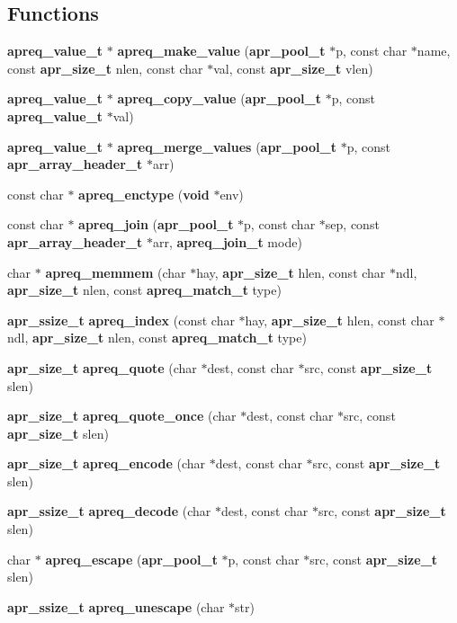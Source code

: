 \subsection*{Functions}
\begin{CompactItemize}
\item 
{\bf apreq\_\-value\_\-t} $\ast$ {\bf apreq\_\-make\_\-value} ({\bf apr\_\-pool\_\-t} $\ast$p, const char $\ast$name, const {\bf apr\_\-size\_\-t} nlen, const char $\ast$val, const {\bf apr\_\-size\_\-t} vlen)
\item 
{\bf apreq\_\-value\_\-t} $\ast$ {\bf apreq\_\-copy\_\-value} ({\bf apr\_\-pool\_\-t} $\ast$p, const {\bf apreq\_\-value\_\-t} $\ast$val)
\item 
{\bf apreq\_\-value\_\-t} $\ast$ {\bf apreq\_\-merge\_\-values} ({\bf apr\_\-pool\_\-t} $\ast$p, const {\bf apr\_\-array\_\-header\_\-t} $\ast$arr)
\item 
const char $\ast$ {\bf apreq\_\-enctype} ({\bf void} $\ast$env)
\item 
const char $\ast$ {\bf apreq\_\-join} ({\bf apr\_\-pool\_\-t} $\ast$p, const char $\ast$sep, const {\bf apr\_\-array\_\-header\_\-t} $\ast$arr, {\bf apreq\_\-join\_\-t} mode)
\item 
char $\ast$ {\bf apreq\_\-memmem} (char $\ast$hay, {\bf apr\_\-size\_\-t} hlen, const char $\ast$ndl, {\bf apr\_\-size\_\-t} nlen, const {\bf apreq\_\-match\_\-t} type)
\item 
{\bf apr\_\-ssize\_\-t} {\bf apreq\_\-index} (const char $\ast$hay, {\bf apr\_\-size\_\-t} hlen, const char $\ast$ndl, {\bf apr\_\-size\_\-t} nlen, const {\bf apreq\_\-match\_\-t} type)
\item 
{\bf apr\_\-size\_\-t} {\bf apreq\_\-quote} (char $\ast$dest, const char $\ast$src, const {\bf apr\_\-size\_\-t} slen)
\item 
{\bf apr\_\-size\_\-t} {\bf apreq\_\-quote\_\-once} (char $\ast$dest, const char $\ast$src, const {\bf apr\_\-size\_\-t} slen)
\item 
{\bf apr\_\-size\_\-t} {\bf apreq\_\-encode} (char $\ast$dest, const char $\ast$src, const {\bf apr\_\-size\_\-t} slen)
\item 
{\bf apr\_\-ssize\_\-t} {\bf apreq\_\-decode} (char $\ast$dest, const char $\ast$src, const {\bf apr\_\-size\_\-t} slen)
\item 
char $\ast$ {\bf apreq\_\-escape} ({\bf apr\_\-pool\_\-t} $\ast$p, const char $\ast$src, const {\bf apr\_\-size\_\-t} slen)
\item 
{\bf apr\_\-ssize\_\-t} {\bf apreq\_\-unescape} (char $\ast$str)

\end{CompactItemize}
